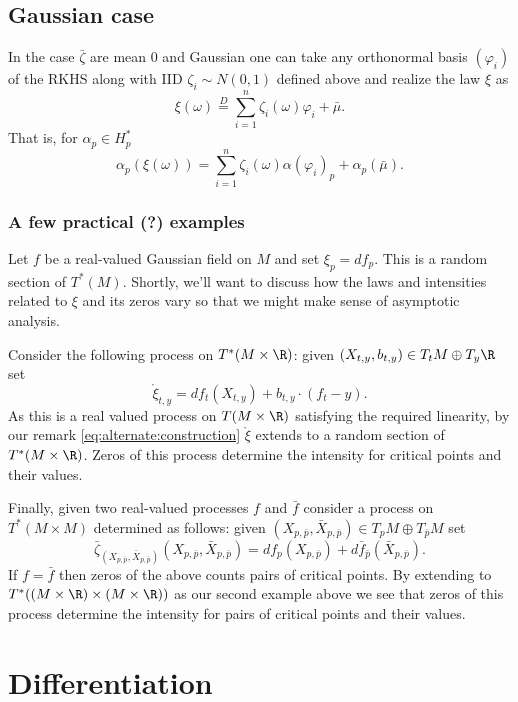 \documentclass{article}
\newcommand{\randsec}{\xi}
\newcommand{\linprocess}{\mathring{\randsec}}
\newcommand{\meansec}{\bar{\mu}}
\begin{document}
\begin{eqaution}
\subsection{Gaussian case}

In the case $\bar{\zeta}$ are mean 0 and Gaussian one can take any orthonormal basis
$(\varphi_i)$ of the RKHS along with IID $\zeta_i \sim N(0,1)$ defined above and realize the law $\randsec$ as
\begin{equation}
  \label{eq:KL}
\randsec(\omega) \overset{D}{=} \sum_{i=1}^n \zeta_i(\omega) \varphi_i + \meansec.
\end{equation}
That is, for $\alpha_p \in H_p^*$
$$
\alpha_p(\randsec(\omega)) = \sum_{i=1}^n \zeta_i(\omega) \alpha(\varphi_i)_p + \alpha_p(\meansec).
$$

\subsubsection{A few practical (?) examples}

Let $f$ be a real-valued Gaussian field on $M$ and set $\randsec_p = df_p$. This is a random section of $T^*(M)$. Shortly,
we'll want to discuss how the laws and intensities related to $\randsec$ and its zeros vary so that we might make
sense of asymptotic analysis. 

Consider the following process on $T^*(M \times \R)$: given $(X_{t,y}, b_{t,y}) \in T_t M \oplus T_y \R$ set
$$
\linprocess_{t,y} = df_t(X_{t,y}) + b_{t,y} \cdot (f_t - y).
$$
As this is a real valued process on $T(M \times \R)$ satisfying the required linearity, by our remark
\eqref{eq:alternate:construction} $\linprocess$ extends to a random section of $T^*(M \times \R)$. Zeros of
this process determine the intensity for critical points and their values.

Finally, given two real-valued processes $f$ and $\bar{f}$ consider a process on $T^*(M \times M)$ determined as follows: given $(X_{p,\bar{p}}, \bar{X}_{p,\bar{p}}) \in T_pM \oplus T_{\bar{p}}M$
set
$$
\bar{\zeta}_{(X_{p,\bar{p}}, \bar{X}_{p,\bar{p}})}(X_{p,\bar{p}}, \bar{X}_{p,\bar{p}}) = df_p(X_{p,\bar{p}}) + d\bar{f}_{\bar{p}}(\bar{X}_{p,\bar{p}}).
$$ If $f=\bar{f}$ then zeros of the above counts pairs of critical
points. By extending to $T^*((M \times \R) \times (M \times \R))$ as
our second example above we see that zeros of this process determine
the intensity for pairs of critical points and their values.

\section{Differentiation}


\end{eqaution}
\end{document}
